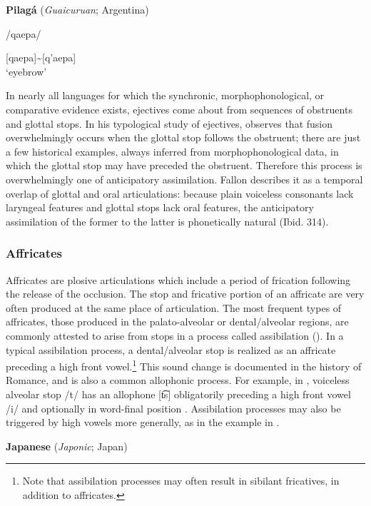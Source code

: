 \ea\label{ex:4.44}
  \textbf{Pilagá} (\textit{Guaicuruan}; Argentina)

/qaepa/

[qaepa]{\textasciitilde}[q’aepa]\\
\glt ‘eyebrow’
\citep[36]{Vidal2001}
\z

  In nearly all languages for which the synchronic, morphophonological, or comparative evidence exists, ejectives come about from sequences of obstruents and glottal stops. In his typological study of ejectives, \citet[314]{Fallon2002} observes that fusion overwhelmingly occurs when the glottal stop follows the obstruent; there are just a few historical examples, always inferred from morphophonological data, in which the glottal stop may have preceded the obstruent. Therefore this process is overwhelmingly one of anticipatory assimilation. Fallon describes it as a temporal overlap of glottal and oral articulations: because plain voiceless consonants lack laryngeal features and glottal stops lack oral features, the anticipatory assimilation of the former to the latter is phonetically natural (Ibid. 314).

\subsubsection{{Affricates}}\label{sec:4.5.2.4}

  Affricates are plosive articulations which include a period of frication following the release of the occlusion. The stop and fricative portion of an affricate are very often produced at the same place of articulation. The most frequent types of affricates, those produced in the palato-alveolar or dental/alveolar regions, are commonly attested to arise from stops in a process called assibilation (\citealt{HallHamann2006,Telfer2006}). In a typical assibilation process, a dental/alveolar stop is realized as an affricate preceding a high front vowel.\footnote{{Note that assibilation processes may often result in sibilant fricatives, in addition to affricates.}} This sound change is documented in the history of Romance, and is also a common allophonic process. For example, in , voiceless alveolar stop /t/ has an allophone [t͡s] obligatorily preceding a high front vowel /i/ and optionally in word-final position \citep[333]{Fortescue1984}. Assibilation processes may also be triggered by high vowels more generally, as in the  example in .

\ea\label{ex:4.45}
  \textbf{Japanese} (\textit{Japonic}; Japan)

